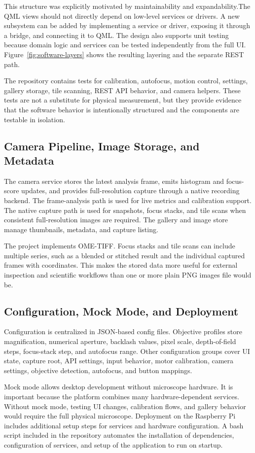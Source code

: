 This structure was explicitly motivated by maintainability and expandability.The QML views should not directly depend on low-level services or drivers. A new subsystem can be added by implementing a service or driver, exposing it through a bridge, and connecting it to QML. The design also supports unit testing because domain logic and services can be tested independently from the full UI. Figure~\ref{fig:software-layers} shows the resulting layering and the separate REST path.

The repository contains tests for calibration, autofocus, motion control, settings, gallery storage, tile scanning, REST API behavior, and camera helpers. These tests are not a substitute for physical measurement, but they provide evidence that the software behavior is intentionally structured and the components are testable in isolation.



\subsection{Camera Pipeline, Image Storage, and Metadata}

The camera service stores the latest analysis frame, emits histogram and focus-score updates, and provides full-resolution capture through a native recording backend. The frame-analysis path is used for live metrics and calibration support. The native capture path is used for snapshots, focus stacks, and tile scans when consistent full-resolution images are required. The gallery and image store manage thumbnails, metadata, and capture listing.

The project implements OME-TIFF. Focus stacks and tile scans can include multiple series, such as a blended or stitched result and the individual captured frames with coordinates. This makes the stored data more useful for external inspection and scientific workflows than one or more plain PNG images file would be.

\subsection{Configuration, Mock Mode, and Deployment}

Configuration is centralized in JSON-based config files. Objective profiles store magnification, numerical aperture, backlash values, pixel scale, depth-of-field steps, focus-stack step, and autofocus range. Other configuration groups cover UI state, capture root, API settings, input behavior, motor calibration, camera settings, objective detection, autofocus, and button mappings.

Mock mode allows desktop development without microscope hardware. It is important because the platform combines many hardware-dependent services. Without mock mode, testing UI changes, calibration flows, and gallery behavior would require the full physical microscope. Deployment on the Raspberry Pi includes additional setup steps for services and hardware configuration. A bash script included in the repository automates the installation of dependencies, configuration of services, and setup of the application to run on startup.
